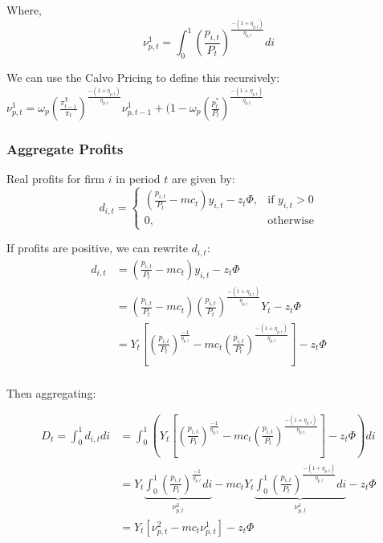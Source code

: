 \documentclass[article,11pt,letterpaper,fleqn]{article}
\theoremstyle{definition}
\numberwithin{equation}{section}
\begin{document}
Where,
\begin{equation}
\label{price_disp2}
\nu^{1}_{p,t}=\int_{0}^{1}\left(\frac{p_{i,t}}{P_{t}}\right)^{\frac{-(1+\eta_{p,t})}{\eta_{p,t}}}di
\end{equation}

We can use the Calvo Pricing to define this recursively: $\nu^{1}_{p,t}=\omega_{p}\left(\frac{\pi^{\chi}_{t-1}}{\pi_{t}}\right)^{\frac{-(1+\eta_{p,t})}{\eta_{p,t}}}\nu^{1}_{p,t-1}+ (1-\omega_{p}\left(\frac{p^{*}_{t}}{P_{t}}\right)^{\frac{-(1+\eta_{p,t})}{\eta_{p,t}}}$

\subsubsection{Aggregate Profits}
Real profits for firm $i$ in period $t$ are given by:
\begin{equation}
d_{i,t}=\begin{cases}
    \left(\frac{p_{i,t}}{P_{t}}-mc_{t}\right)y_{i,t}-z_{t}\Phi , & \text{if $y_{i,t}>0$} \\
    0, & \text{otherwise}
      \end{cases}
\end{equation}

If profits are positive, we can rewrite $d_{i,t}$:
\begin{equation}
\begin{split}
d_{i,t}& =  \left(\frac{p_{i,t}}{P_{t}}-mc_{t}\right)y_{i,t}-z_{t}\Phi \\
 & =  \left(\frac{p_{i,t}}{P_{t}}-mc_{t}\right)\left(\frac{p_{i,t}}{P_{t}}\right)^{\frac{-(1+\eta_{p,t})}{\eta_{p,t}}}Y_{t}-z_{t}\Phi \\
 & = Y_{t}\left[\left(\frac{p_{i,t}}{P_{t}}\right)^{\frac{-1}{\eta_{p,t}}}-mc_{t}\left(\frac{p_{i,t}}{P_{t}}\right)^{\frac{-(1+\eta_{p,t})}{\eta_{p,t}}}\right]-z_{t}\Phi \\
\end{split}
\end{equation}

Then aggregating:

\begin{equation}
\begin{split}
\label{agg_profits}
D_{t}= \int_{0}^{1}d_{i,t}di & = \int_{0}^{1}\left(Y_{t}\left[\left(\frac{p_{i,t}}{P_{t}}\right)^{\frac{-1}{\eta_{p,t}}}-mc_{t}\left(\frac{p_{i,t}}{P_{t}}\right)^{\frac{-(1+\eta_{p,t})}{\eta_{p,t}}}\right]-z_{t}\Phi\right)di \\
 & =   Y_{t}\underbrace{\int_{0}^{1}\left(\frac{p_{i,t}}{P_{t}}\right)^{\frac{-1}{\eta_{p,t}}}di}_{\nu^{2}_{p,t}} - mc_{t}Y_{t}\underbrace{\int_{0}^{1}\left(\frac{p_{i,t}}{P_{t}}\right)^{\frac{-(1+\eta_{p,t})}{\eta_{p,t}}}di}_{\nu^{1}_{p,t}}-z_{t}\Phi \\
 & = Y_{t}\left[\nu^{2}_{p,t} - mc_{t}\nu^{1}_{p,t}\right] - z_{t}\Phi
\end{split}
\end{equation}
\end{document}

